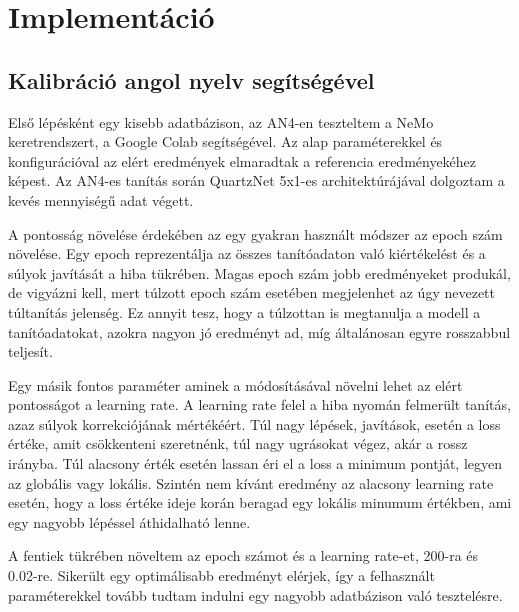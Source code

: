 \chapter{Implementáció}

\section{Kalibráció angol nyelv segítségével}

Első lépésként egy kisebb adatbázison, az AN4-en teszteltem a NeMo keretrendszert, a Google Colab segítségével. Az alap paraméterekkel és konfigurációval az elért eredmények elmaradtak a referencia eredményekéhez képest. Az AN4-es tanítás során QuartzNet 5x1-es architektúrájával dolgoztam a kevés mennyiségű adat végett.

A pontosság növelése érdekében az egy gyakran használt módszer az epoch szám növelése. Egy epoch reprezentálja az összes tanítóadaton való kiértékelést és a súlyok javítását a hiba tükrében. Magas epoch szám jobb eredményeket produkál, de vigyázni kell, mert túlzott epoch szám esetében megjelenhet az úgy nevezett túltanítás jelenség. Ez annyit tesz, hogy a túlzottan is megtanulja a modell a tanítóadatokat, azokra nagyon jó eredményt ad, míg általánosan egyre rosszabbul teljesít.

Egy másik fontos paraméter aminek a módosításával növelni lehet az elért pontosságot a learning rate. A learning rate felel a hiba nyomán felmerült tanítás, azaz súlyok korrekciójának mértékéért. Túl nagy lépések, javítások, esetén a loss értéke, amit csökkenteni szeretnénk, túl nagy ugrásokat végez, akár a rossz irányba. Túl alacsony érték esetén lassan éri el a loss a minimum pontját, legyen az globális vagy lokális. Szintén nem kívánt eredmény az alacsony learning rate esetén, hogy a loss értéke ideje korán beragad egy lokális minumum értékben, ami egy nagyobb lépéssel áthidalható lenne.


A fentiek tükrében növeltem az epoch számot és a learning rate-et, 200-ra és 0.02-re. Sikerült egy optimálisabb eredményt elérjek, így a felhasznált paraméterekkel tovább tudtam indulni egy nagyobb adatbázison való tesztelésre.

